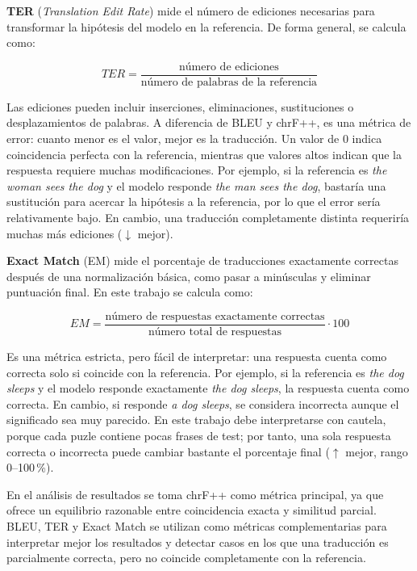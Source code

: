 \textbf{TER} \citep{snover2006ter} (\textit{Translation Edit Rate}) mide el número de ediciones necesarias para transformar la hipótesis del modelo en la referencia. De forma general, se calcula como:

\[
TER = \frac{\text{número de ediciones}}{\text{número de palabras de la referencia}}
\]

Las ediciones pueden incluir inserciones, eliminaciones, sustituciones o desplazamientos de palabras. A diferencia de BLEU y chrF++, es una métrica de error: cuanto menor es el valor, mejor es la traducción. Un valor de 0 indica coincidencia perfecta con la referencia, mientras que valores altos indican que la respuesta requiere muchas modificaciones. Por ejemplo, si la referencia es \textit{the woman sees the dog} y el modelo responde \textit{the man sees the dog}, bastaría una sustitución para acercar la hipótesis a la referencia, por lo que el error sería relativamente bajo. En cambio, una traducción completamente distinta requeriría muchas más ediciones (\(\downarrow\) mejor).

\textbf{Exact Match} (EM) mide el porcentaje de traducciones exactamente correctas después de una normalización básica, como pasar a minúsculas y eliminar puntuación final. En este trabajo se calcula como:

\[
EM = \frac{\text{número de respuestas exactamente correctas}}{\text{número total de respuestas}} \cdot 100
\]

Es una métrica estricta, pero fácil de interpretar: una respuesta cuenta como correcta solo si coincide con la referencia. Por ejemplo, si la referencia es \textit{the dog sleeps} y el modelo responde exactamente \textit{the dog sleeps}, la respuesta cuenta como correcta. En cambio, si responde \textit{a dog sleeps}, se considera incorrecta aunque el significado sea muy parecido. En este trabajo debe interpretarse con cautela, porque cada puzle contiene pocas frases de test; por tanto, una sola respuesta correcta o incorrecta puede cambiar bastante el porcentaje final (\(\uparrow\) mejor, rango 0--100\,\%).

En el análisis de resultados se toma chrF++ como métrica principal, ya que ofrece un equilibrio razonable entre coincidencia exacta y similitud parcial. BLEU, TER y Exact Match se utilizan como métricas complementarias para interpretar mejor los resultados y detectar casos en los que una traducción es parcialmente correcta, pero no coincide completamente con la referencia.

